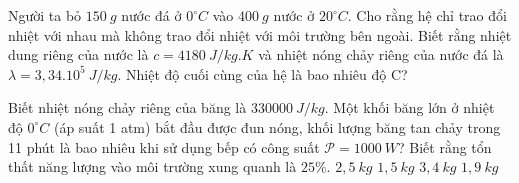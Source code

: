 \begin{ex} 
	Người ta bỏ $150 \ g$ nước đá ở $0^\circ C$ vào $400 \ g$ nước ở $20^\circ C$. Cho rằng hệ chỉ trao đổi nhiệt với nhau mà không trao đổi nhiệt với môi trường bên ngoài. Biết rằng nhiệt dung riêng của nước là $c=4180 \ J/kg. K$ và nhiệt nóng chảy riêng của nước đá là $\lambda=3,34 . 10^{5} \ J/kg$. Nhiệt độ cuối cùng của hệ là bao nhiêu độ C?
\end{ex}

	
	







\begin{ex} 
	Biết nhiệt nóng chảy riêng của băng là $330000 \ J /kg$. Một khối băng lớn ở nhiệt độ $0^\circ C$ (áp suất 1 atm) bắt đầu được đun nóng, khối lượng băng tan chảy trong 11 phút là bao nhiêu khi sử dụng bếp có công suất $\mathcal{P}=1000 \ W$? Biết rằng tổn thất năng lượng vào môi trường xung quanh là $25 \%$.
	\choice
	{$2,5 \ kg$}
	{\True $1,5 \ kg$}
	{$3,4 \ kg$}
	{$1,9 \ kg$}
\end{ex}
 
